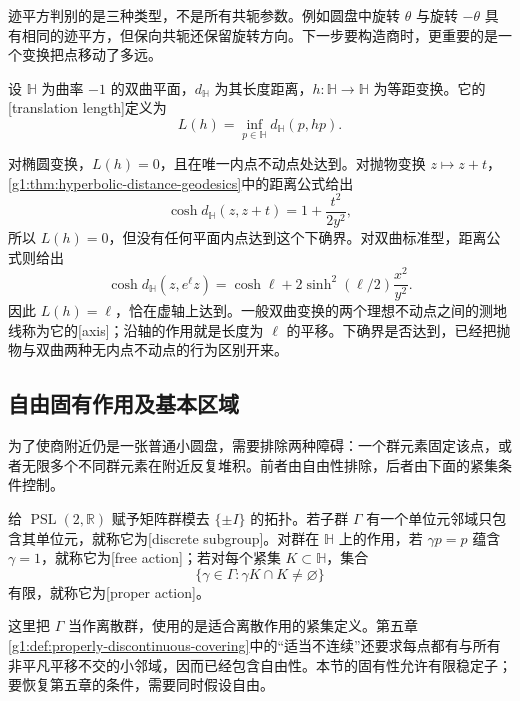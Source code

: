 迹平方判别的是三种类型，不是所有共轭参数。例如圆盘中旋转 \(\theta\) 与旋转 \(-\theta\) 具有相同的迹平方，但保向共轭还保留旋转方向。下一步要构造商时，更重要的是一个变换把点移动了多远。

\begin{definition}\label{g1:def:hyperbolic-translation-length}
	设 \(\mathbb H\) 为曲率 \(-1\) 的双曲平面，\(d_{\mathbb H}\) 为其长度距离，\(h:\mathbb H\to\mathbb H\) 为等距变换。它的[translation length]定义为
	\[
		L(h)=\inf_{p\in\mathbb H}d_{\mathbb H}(p,hp).
	\]
\end{definition}

对椭圆变换，\(L(h)=0\)，且在唯一内点不动点处达到。对抛物变换 \(z\mapsto z+t\)，\cref{g1:thm:hyperbolic-distance-geodesics}中的距离公式给出
\[
	\cosh d_{\mathbb H}(z,z+t)=1+\frac{t^2}{2y^2},
\]
所以 \(L(h)=0\)，但没有任何平面内点达到这个下确界。对双曲标准型，距离公式则给出
\begin{equation}\label{g1:eq:hyperbolic-displacement}
	\cosh d_{\mathbb H}(z,e^\ell z)
	=\cosh\ell+2\sinh^2(\ell/2)\frac{x^2}{y^2}.
\end{equation}
因此 \(L(h)=\ell\)，恰在虚轴上达到。一般双曲变换的两个理想不动点之间的测地线称为它的[axis]；沿轴的作用就是长度为 \(\ell\) 的平移。下确界是否达到，已经把抛物与双曲两种无内点不动点的行为区别开来。

\subsection{自由固有作用及基本区域}
\label{g1:subsec:1002:02}

为了使商附近仍是一张普通小圆盘，需要排除两种障碍：一个群元素固定该点，或者无限多个不同群元素在附近反复堆积。前者由自由性排除，后者由下面的紧集条件控制。

\begin{definition}\label{g1:def:discrete-proper-isometric-action}
	给 \(\operatorname{PSL}(2,\mathbb R)\) 赋予矩阵群模去 \(\{\pm I\}\) 的拓扑。若子群 \(\Gamma\) 有一个单位元邻域只包含其单位元，就称它为[discrete subgroup]。对群在 \(\mathbb H\) 上的作用，若 \(\gamma p=p\) 蕴含 \(\gamma=1\)，就称它为[free action]；若对每个紧集 \(K\subset\mathbb H\)，集合
	\[
		\{\gamma\in\Gamma:\gamma K\cap K\ne\varnothing\}
	\]
	有限，就称它为[proper action]。
\end{definition}

这里把 \(\Gamma\) 当作离散群，使用的是适合离散作用的紧集定义。第五章\cref{g1:def:properly-discontinuous-covering}中的“适当不连续”还要求每点都有与所有非平凡平移不交的小邻域，因而已经包含自由性。本节的固有性允许有限稳定子；要恢复第五章的条件，需要同时假设自由。

